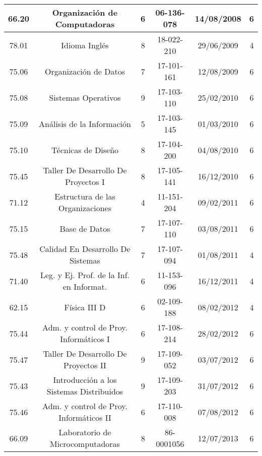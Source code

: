 {\begin{center}
\begin{tabular}{|c|c|c|c|c|c|}
            \hline
            66.20 & Organización de Computadoras             & 6  & 06-136-078 & 14/08/2008 & 6 \\
            \hline
            78.01 & Idioma Inglés                            & 8  & 18-022-210 & 29/06/2009 & 4 \\
            \hline
            75.06 & Organización de Datos                    & 7  & 17-101-161 & 12/08/2009 & 6 \\
            \hline
            75.08 & Sistemas Operativos                      & 9  & 17-103-110 & 25/02/2010 & 6 \\
            \hline
            75.09 & Análisis de la Información               & 5  & 17-103-145 & 01/03/2010 & 6 \\
            \hline
            75.10 & Técnicas de Diseño                       & 8  & 17-104-200 & 04/08/2010 & 6 \\
            \hline
            75.45 & Taller De Desarrollo De Proyectos I      & 8  & 17-105-141 & 16/12/2010 & 6 \\
            \hline
            71.12 & Estructura de las Organizaciones         & 4  & 11-151-204 & 09/02/2011 & 6 \\
            \hline
            75.15 & Base de Datos                            & 7  & 17-107-110 & 03/08/2011 & 6 \\
            \hline
            75.48 & Calidad En Desarrollo De Sistemas        & 7  & 17-107-094 & 01/08/2011 & 4 \\
            \hline
            71.40 & Leg. y Ej. Prof. de la Inf. en Informat. & 6  & 11-153-096 & 16/12/2011 & 4 \\
            \hline
            62.15 & Física III D                             & 6  & 02-109-188 & 08/02/2012 & 4 \\
            \hline
            75.44 & Adm. y control de Proy. Informáticos I   & 6  & 17-108-214 & 28/02/2012 & 6 \\
            \hline
            75.47 & Taller De Desarrollo De Proyectos II     & 9  & 17-109-052 & 03/07/2012 & 6 \\
            \hline
            75.43 & Introducción a los Sistemas Distribuidos & 9  & 17-109-203 & 31/07/2012 & 6 \\
            \hline
            75.46 & Adm. y control de Proy. Informáticos II  & 6  & 17-110-008 & 07/08/2012 & 6 \\
            \hline
            66.09 & Laboratorio de Microcomputadoras         & 8  & 86-0001056 & 12/07/2013 & 6 \\

\end{tabular}
\end{center}}
